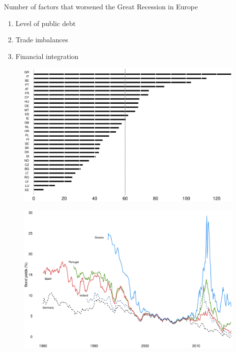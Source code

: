 \documentclass{beamer}
\begin{document}
\begin{frame}
  Number of factors that worsened the Great Recession in Europe
  \begin{enumerate}
    \item Level of public debt
    \item Trade imbalances
    \item Financial integration
  \end{enumerate}
\end{frame}

\begin{frame}
  \begin{figure}
    \includegraphics[scale=.3]{public_debt.eps}
  \end{figure}
\end{frame}

\begin{frame}
  \begin{figure}
    \includegraphics[scale=.3]{bonds.eps}
  \end{figure}
\end{frame}
\end{document}
